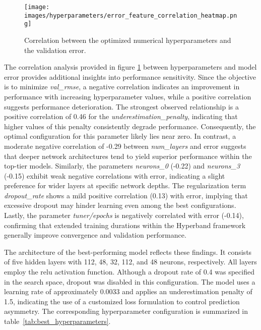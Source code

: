 \begin{figure}[H]
	\centering
	\texttt{[image: images/hyperparameters/error\_feature\_correlation\_heatmap.png]}
	\caption{Correlation between the optimized numerical hyperparameters and the validation error.}
	\label{fig:error_feature_correlation_heatmap}
\end{figure}

The correlation analysis provided in figure \ref{fig:error_feature_correlation_heatmap} between hyperparameters and model error provides additional insights into performance sensitivity. Since the objective is to minimize \textit{val\_rmse}, a negative correlation indicates an improvement in performance with increasing hyperparameter values, while a positive correlation suggests performance deterioration. The strongest observed relationship is a positive correlation of 0.46 for the \textit{underestimation\_penalty}, indicating that higher values of this penalty consistently degrade performance. Consequently, the optimal configuration for this parameter likely lies near zero. In contrast, a moderate negative correlation of -0.29 between \textit{num\_layers} and error suggests that deeper network architectures tend to yield superior performance within the top-tier models. Similarly, the parameters \textit{neurons\_0} (-0.22) and \textit{neurons\_3} (-0.15) exhibit weak negative correlations with error, indicating a slight preference for wider layers at specific network depths. The regularization term \textit{dropout\_rate} shows a mild positive correlation (0.13) with error, implying that excessive dropout may hinder learning even among the best configurations. Lastly, the parameter \textit{tuner/epochs} is negatively correlated with error (-0.14), confirming that extended training durations within the Hyperband framework generally improve convergence and validation performance.

The architecture of the best-performing model reflects these findings. It consists of five hidden layers with 112, 48, 32, 112, and 48 neurons, respectively. All layers employ the \ac{relu} activation function. Although a dropout rate of 0.4 was specified in the search space, dropout was disabled in this configuration. The model uses a learning rate of approximately 0.0033 and applies an underestimation penalty of 1.5, indicating the use of a customized loss formulation to control prediction asymmetry. The corresponding hyperparameter configuration is summarized in table~\ref{tab:best_hyperparameters}.

